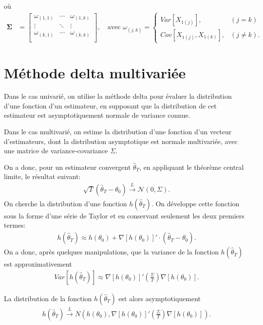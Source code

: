 où
\begin{align*}
  \mathbf{\Sigma} &= \begin{bmatrix}
    \omega_{(1,1)} &\cdots& \omega_{(1,k)} \\
    \vdots & \ddots & \vdots \\
    \omega_{(k,1)} &\cdots& \omega_{(k,k)} \\
  \end{bmatrix} ,\quad \mbox{avec } \omega_{(j,k)} = \begin{cases}
    Var\left[X_{1(j)}\right] , &(j=k) \\
    Cov\left[X_{1(j)},X_{1(k)}\right] , &(j \neq k).
  \end{cases}
\end{align*}

\section{Méthode delta multivariée}
\label{sec:deltamethod}

Dans le cas univarié, on utilise la méthode delta pour évaluer la
distribution d'une fonction d'un estimateur, en supposant que la
distribution de cet estimateur est asymptotiquement normale de
variance connue.

Dans le cas multivarié, on estime la distribution d'une fonction d'un
vecteur d'estimateurs, dont la distribution asymptotique est normale
multivariée, avec une matrice de variance-covariance $\Sigma$.

On a donc, pour un estimateur convergent $\hat\theta_T$, en appliquant
le théorème central limite, le résultat suivant:
\begin{align}
  \sqrt{T} (\hat\theta_T - \theta_0) \stackrel{L}{\longrightarrow}
  \mathcal{N}(0,\Sigma).
\end{align}
On cherche la distribution d'une fonction $h(\hat\theta_T)$. On
développe cette fonction sous la forme d'une série de Taylor et en
conservant seulement les deux premiers termes:
\begin{align}
  h(\hat\theta_T) \approx h(\theta_0) + \nabla
  \left[h(\theta_0)\right]'\cdot(\hat\theta_T - \theta_0).
\end{align}
On a donc, après quelques manipulations, que la variance de la
fonction $h(\hat\theta_T)$ est approximativement
\begin{align}
  Var\left[h(\hat\theta_T) \right] \approx \nabla
  \left[h(\theta_0)\right]' \left(\frac{\Sigma}{T}\right) \nabla
  \left[h(\theta_0)\right].
\end{align}

La distribution de la fonction $h(\hat\theta_T)$ est alors
asymptotiquement
\begin{align}
  \label{eq:deltamethodmult}
  h(\hat\theta_T) \stackrel{L}{\longrightarrow}
  N\left(h(\theta_0),\nabla \left[h(\theta_0)\right]'
    \left(\frac{\Sigma}{T}\right) \nabla
    \left[h(\theta_0)\right]\right).
\end{align}



